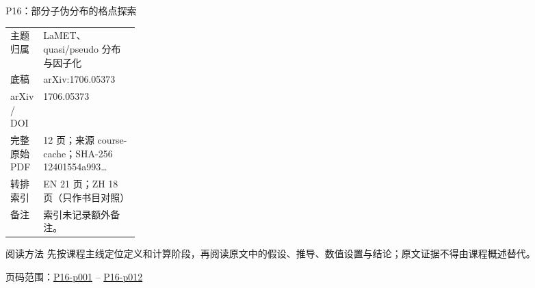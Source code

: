 \documentclass[aspectratio=169,10pt]{ctexbeamer}
\begin{document}
\begin{frame}[t]{P16：部分子伪分布的格点探索}
\small\begin{tabularx}{\linewidth}{p{0.22\linewidth}Y}
\toprule 主题归属 & LaMET、quasi/\allowbreak{}pseudo 分布与因子化\\
底稿 & arXiv:1706.05373\\
arXiv / DOI & 1706.05373\\
完整原始 PDF & 12 页；来源 course-cache；SHA-256 12401554a993\ldots\\
转排索引 & EN 21 页；ZH 18 页（只作书目对照）\\
备注 & 索引未记录额外备注。\\
\bottomrule\end{tabularx}\vspace{0.25cm}
\begin{block}{阅读方法}
先按课程主线定位定义和计算阶段，再阅读原文中的假设、推导、数值设置与结论；原文证据不得由课程概述替代。
\end{block}
\vfill 页码范围：\hyperlink{P16-p001}{P16-p001} -- \hyperlink{P16-p012}{P16-p012}
\end{frame}
\end{document}
